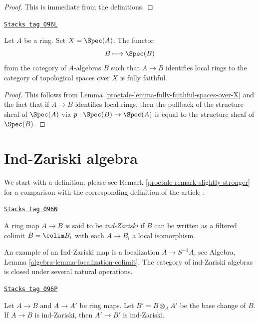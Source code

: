 \begin{proof}
This is immediate from the definitions.
\end{proof}

\begin{lemma}
\label{proetale-lemma-local-isomorphism-fully-faithful}
\href{https://stacks.math.columbia.edu/tag/096L}{\texttt{Stacks tag 096L}}

Let $A$ be a ring. Set $X = \Spec(A)$. The functor
$$
B \longmapsto \Spec(B)
$$
from the category of $A$-algebras $B$ such that $A \to B$ identifies
local rings to the category of
topological spaces over $X$ is fully faithful.
\end{lemma}

\begin{proof}

This follows from Lemma \ref{proetale-lemma-fully-faithful-spaces-over-X}
and the fact that if $A \to B$ identifies local rings, then the pullback
of the structure sheaf of $\Spec(A)$ via $p : \Spec(B) \to \Spec(A)$
is equal to the structure sheaf of $\Spec(B)$.
\end{proof}

\section{Ind-Zariski algebra}
\label{proetale-section-ind-zariski}
We start with a definition; please see Remark \ref{proetale-remark-slightly-stronger}
for a comparison with the corresponding definition of the article \cite{BS}.

\begin{definition}
\label{proetale-definition-ind-zariski}
\href{https://stacks.math.columbia.edu/tag/096N}{\texttt{Stacks tag 096N}}

A ring map $A \to B$ is said to be {\it ind-Zariski} if $B$ can be written
as a filtered colimit $B = \colim B_i$ with each $A \to B_i$ a local
isomorphism.
\end{definition}

An example of an Ind-Zariski map is a localization $A \to S^{-1}A$, see
Algebra, Lemma \ref{algebra-lemma-localization-colimit}.
The category of ind-Zariski algebras is closed under several natural
operations.

\begin{lemma}
\label{proetale-lemma-base-change-ind-zariski}
\href{https://stacks.math.columbia.edu/tag/096P}{\texttt{Stacks tag 096P}}

Let $A \to B$ and $A \to A'$ be ring maps. Let $B' = B \otimes_A A'$
be the base change of $B$.
If $A \to B$ is ind-Zariski, then $A' \to B'$ is ind-Zariski.
\end{lemma}

